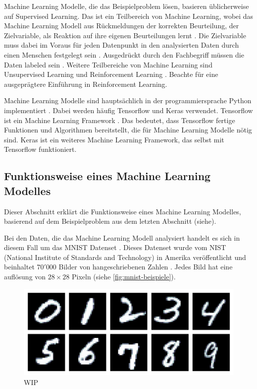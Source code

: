 Machine Learning Modelle, die das Beispielproblem lösen, basieren üblicherweise
auf Supervised Learning. Das ist ein Teilbereich von Machine Learning, wobei das
Machine Learning Modell aus Rückmeldungen der korrekten Beurteilung, der
Zielvariable, als Reaktion auf ihre eigenen Beurteilungen lernt
\cite{noauthor_was_nodate-1}. Die Zielvariable muss dabei im Voraus für jeden
Datenpunkt in den analysierten Daten durch einen Menschen festgelegt sein
\cite{trahasich_31_2020}. Ausgedrückt durch den Fachbegriff müssen die Daten
labeled sein \cite{noauthor_21_nodate}. Weitere Teilbereiche von Machine
Learning sind Unsupervised Learning und Reinforcement Learning
\cite{arora_supervised_2020}. Beachte  für eine ausgeprägtere
Einführung in Reinforcement Learning.

Machine Learning Modelle sind hauptsächlich in der programmiersprache Python
implementiert \cite{sadie_bennett_why_2019}. Dabei werden häufig Tensorflow und Keras
verwendet. Tensorflow ist ein Machine Learning Framework
\cite{noauthor_tensorflow_nodate}. Das bedeutet, dass Tensorflow fertige
Funktionen und Algorithmen bereitstellt, die für Machine Learning Modelle nötig
sind. Keras ist ein weiteres Machine Learning Framework, das selbst mit
Tensorflow funktioniert.


\subsection{Funktionsweise eines Machine Learning Modelles}\label{sub:t_ml_func}
Dieser Abschnitt erklärt die Funktionsweise eines Machine Learning Modelles,
basierend auf dem Beispielproblem aus dem letzten Abschnitt (siehe). 

Bei den Daten, die das Machine Learning Modell analysiert handelt es sich in
diesem Fall um das MNIST Datenset \cite{noauthor_mnist_nodate}. Dieses Datenset
wurde vom NIST (National Institute of Standards and Technology) in Amerika
veröffentlicht und beinhaltet $70'000$ Bilder von hangeschriebenen Zahlen
\cite{noauthor_emnist_2017}. Jedes Bild hat eine auflösung von $28\times28$
Pixeln (siehe \autoref{fig:mnist-beispiele}).

\begin{figure}[!ht]
    \centering
    \includegraphics[width=\textwidth]{images/theorie/mnist-beispiele.png}
    \caption{WIP}
    \label{fig:mnist-beispiele}
\end{figure}


